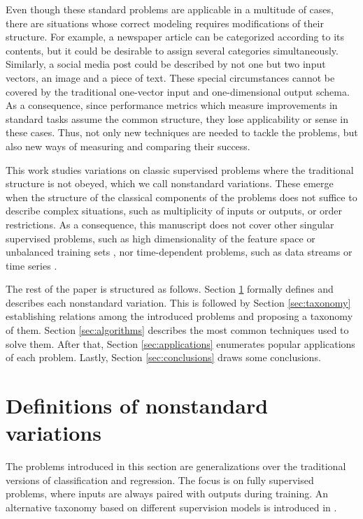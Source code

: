 \documentclass[
	fontsize=11pt, %
	twoside=false, %
	open=any, %
	secnumdepth=1, %
]{kaobook}
\begin{document}
Even though these standard problems are applicable in a multitude of cases, there are situations whose correct modeling requires modifications of their structure. For example, a newspaper article can be categorized according to its contents, but it could be desirable to assign several categories simultaneously. Similarly, a social media post could be described by not one but two input vectors, an image and a piece of text. These special circumstances cannot be covered by the traditional one-vector input and one-dimensional output schema. As a consequence, since performance metrics which measure improvements in standard tasks assume the common structure, they lose applicability or sense in these cases. Thus, not only new techniques are needed to tackle the problems, but also new ways of measuring and comparing their success.

This work studies variations on classic supervised problems where the traditional structure is not obeyed, which we call nonstandard variations. These emerge when the structure of the classical components of the problems does not suffice to describe complex situations, such as multiplicity of inputs or outputs, or order restrictions. As a consequence, this manuscript does not cover other singular supervised problems, such as high dimensionality of the feature space \cite{highdim} or unbalanced training sets \cite{imbalanced,imbalanced-krawczyk}, nor time-dependent problems, such as data streams \cite{streams,streams2} or time series \cite{timeseries}.

The rest of the paper is structured as follows. Section \ref{sec:definitions} formally defines and describes each nonstandard variation. This is followed by Section \ref{sec:taxonomy} establishing relations among the introduced problems and proposing a taxonomy of them. Section \ref{sec:algorithms} describes the most common techniques used to solve them. After that, Section \ref{sec:applications} enumerates popular applications of each problem.  Lastly, Section \ref{sec:conclusions} draws some conclusions.

\section{Definitions of nonstandard variations}
\label{sec:definitions}

The problems introduced in this section are generalizations over the traditional versions of classification and regression. The focus is on fully supervised problems, where inputs are always paired with outputs during training. An alternative taxonomy based on different supervision models is introduced in \cite{weak-nonstandard}.
\end{document}
